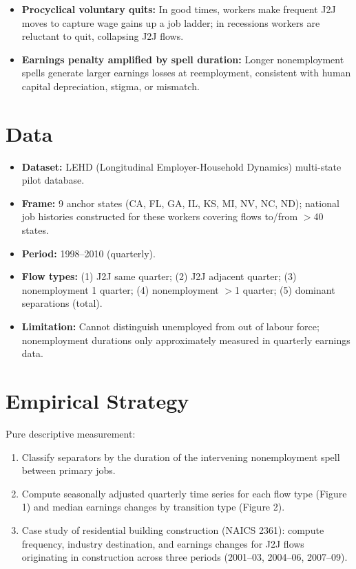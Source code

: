 \begin{itemize}
  \item \textbf{Procyclical voluntary quits:} In good times, workers
    make frequent J2J moves to capture wage gains up a job ladder;
    in recessions workers are reluctant to quit, collapsing J2J flows.
  \item \textbf{Earnings penalty amplified by spell duration:} Longer
    nonemployment spells generate larger earnings losses at reemployment,
    consistent with human capital depreciation, stigma, or mismatch.
\end{itemize}

\section{Data}

\begin{itemize}
  \item \textbf{Dataset:} LEHD (Longitudinal Employer-Household Dynamics)
    multi-state pilot database.
  \item \textbf{Frame:} 9 anchor states (CA, FL, GA, IL, KS, MI, NV, NC, ND);
    national job histories constructed for these workers covering flows to/from
    $>$40 states.
  \item \textbf{Period:} 1998--2010 (quarterly).
  \item \textbf{Flow types:} (1) J2J same quarter; (2) J2J adjacent quarter;
    (3) nonemployment 1 quarter; (4) nonemployment $>$1 quarter;
    (5) dominant separations (total).
  \item \textbf{Limitation:} Cannot distinguish unemployed from out of
    labour force; nonemployment durations only approximately measured
    in quarterly earnings data.
\end{itemize}

\section{Empirical Strategy}

Pure descriptive measurement:
\begin{enumerate}
  \item Classify separators by the duration of the intervening nonemployment
    spell between primary jobs.
  \item Compute seasonally adjusted quarterly time series for each flow type
    (Figure 1) and median earnings changes by transition type (Figure 2).
  \item Case study of residential building construction (NAICS 2361): compute
    frequency, industry destination, and earnings changes for J2J flows
    originating in construction across three periods (2001--03, 2004--06,
    2007--09).
\end{enumerate}

